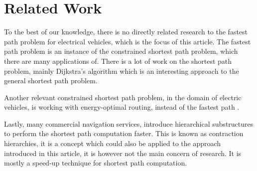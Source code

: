 \section{Related Work}\label{sec:relatedwork}
To the best of our knowledge, there is no directly related research to the fastest path problem for electrical vehicles, which is the focus of this article. The fastest path problem is an instance of the constrained shortest path problem, which there are many applications of. There is a lot of work on the shortest path problem, mainly Dijkstra's algorithm \cite{dijkstra1959note} which is an interesting approach to the general shortest path problem.

Another relevant constrained shortest path problem, in the domain of electric vehicles, is working with energy-optimal routing, instead of the fastest path \cite{artmeier2010shortest}.

Lastly, many commercial navigation services, introduce hierarchical substructures to perform the shortest path computation faster. This is known as contraction hierarchies, it is a concept which could also be applied to the approach introduced in this article, it is however not the main concern of research. It is mostly a speed-up technique for shortest path computation.
